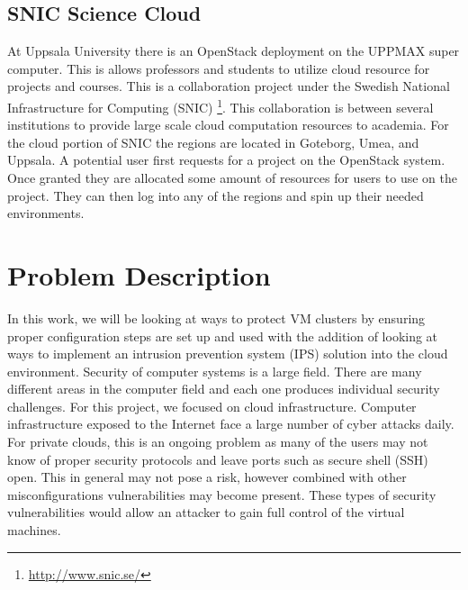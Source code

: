 \documentclass[12pt]{article}
\begin{document}
\subsection{SNIC Science Cloud}
At Uppsala University there is an OpenStack deployment on the UPPMAX super computer. This is allows professors and students to utilize cloud resource for projects and courses.  This is a collaboration project under the Swedish National Infrastructure for Computing (SNIC) \footnote{\href{http://www.snic.se/}{http://www.snic.se/}}.  This collaboration is between several institutions to provide large scale cloud computation resources to academia. For the  cloud portion of SNIC the regions are located in Goteborg, Umea, and Uppsala. A potential user first requests for a project on the OpenStack system. Once granted they are allocated some amount of resources for users to use on the project. They can then log into any of the regions and spin up their needed environments.

\section{Problem Description}
In this work, we will be looking at ways to protect VM clusters by ensuring proper configuration steps are set up and used with the addition of looking at ways to implement an intrusion prevention system (IPS) solution into the cloud environment. Security of computer systems is a large field. There are many different areas in the computer field and each one produces individual security challenges. For this project, we focused on cloud infrastructure. Computer infrastructure exposed to the Internet face a large number of cyber attacks daily\cite{cimpanu_2017}. For private clouds, this is an ongoing problem as many of the users may not know of proper security protocols and leave ports such as secure shell (SSH) open. This in general may not pose a risk, however combined with other misconfigurations vulnerabilities may become present. These types of security vulnerabilities would allow an attacker to gain full control of the virtual machines.
\end{document}
